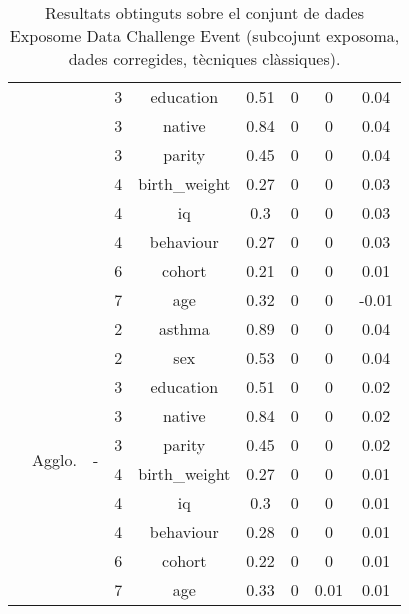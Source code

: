 \documentclass[CAT,BIB]{TFUOC}%
\begin{document}
\begin{table}
\begin{tabular}{@{}ccccccccc@{}}
            &  &  & 3 & education & 0.51 & 0 & 0 & 0.04 \\
            &  &  & 3 & native & 0.84 & 0 & 0 & 0.04 \\
            &  &  & 3 & parity & 0.45 & 0 & 0 & 0.04 \\
            &  &  & 4 & birth\_weight & 0.27 & 0 & 0 & 0.03 \\
            &  &  & 4 & iq & 0.3 & 0 & 0 & 0.03 \\
            &  &  & 4 & behaviour & 0.27 & 0 & 0 & 0.03 \\
            &  &  & 6 & cohort & 0.21 & 0 & 0 & 0.01 \\
            &  &  & 7 & age & 0.32 & 0 & 0 & -0.01 \\ \cmidrule(l){2-9}
            & \multirow{10}{*}{Agglo.} & \multirow{10}{*}{-} & 2 & asthma & 0.89 & 0 & 0 & 0.04 \\
            &  &  & 2 & sex & 0.53 & 0 & 0 & 0.04 \\
            &  &  & 3 & education & 0.51 & 0 & 0 & 0.02 \\
            &  &  & 3 & native & 0.84 & 0 & 0 & 0.02 \\
            &  &  & 3 & parity & 0.45 & 0 & 0 & 0.02 \\
            &  &  & 4 & birth\_weight & 0.27 & 0 & 0 & 0.01 \\
            &  &  & 4 & iq & 0.3 & 0 & 0 & 0.01 \\
            &  &  & 4 & behaviour & 0.28 & 0 & 0 & 0.01 \\
            &  &  & 6 & cohort & 0.22 & 0 & 0 & 0.01 \\
            &  &  & 7 & age & 0.33 & 0 & 0.01 & 0.01 \\ \bottomrule
        \end{tabular}
        \caption[Exposome Data Challenge Event: resultats - part 9]{
            Resultats obtinguts sobre el conjunt de dades Exposome Data Challenge Event
            (subcojunt exposoma, dades corregides, tècniques clàssiques).
        }
        \label{t:results_exposome9}
    \end{table}
\end{document}
